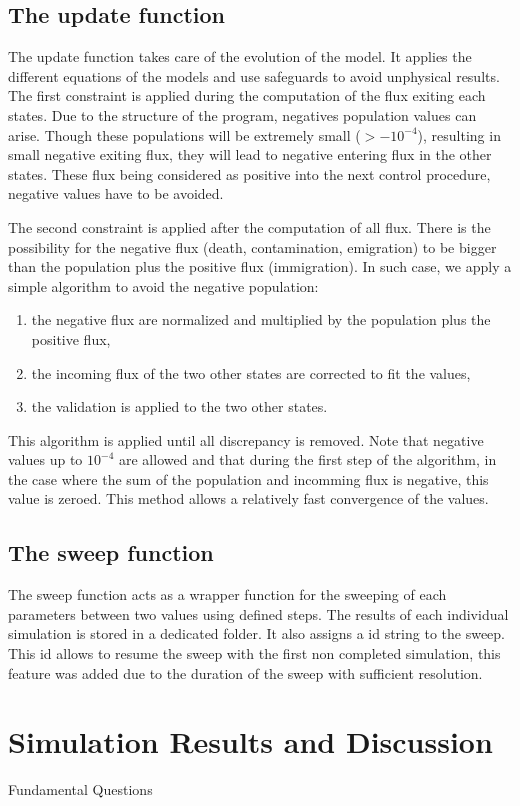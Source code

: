 \documentclass[11pt]{article}
\begin{document}
\subsection{The update function}
The update function takes care of the evolution of the model. It applies the different equations of the models and use safeguards to avoid unphysical results.
The first constraint is applied during the computation of the flux exiting each states. Due to the structure of the program, negatives population values can arise. Though these populations will be extremely small ($> - 10^{-4}$), resulting in small negative exiting flux, they will lead to negative entering flux in the other states. These flux being considered as positive into the next control procedure, negative values have to be avoided.

The second constraint is applied after the computation of all flux. There is the possibility for the negative flux (death, contamination, emigration) to be bigger than the population plus the positive flux (immigration). In such case, we apply a simple algorithm to avoid the negative population:
\begin{enumerate}
	\item the negative flux are normalized and multiplied by the population plus the positive flux,
	\item the incoming flux of the two other states are corrected to fit the values,
	\item the validation is applied to the two other states.
\end{enumerate}
This algorithm is applied until all discrepancy is removed. Note that negative values up to $10^{-4}$ are allowed and that during the first step of the algorithm, in the case where the sum of the population and incomming flux is negative, this value is zeroed. This method allows a relatively fast convergence of the values.

\subsection{The sweep function}
The sweep function acts as a wrapper function for the sweeping of each parameters between two values using defined steps. The results of each individual simulation is stored in a dedicated folder. It also assigns a id string to the sweep. This id allows to resume the sweep with the first non completed simulation, this feature was added due to the duration of the sweep with sufficient resolution. 
\section{Simulation Results and Discussion}\indent
Fundamental Questions
\end{document}
